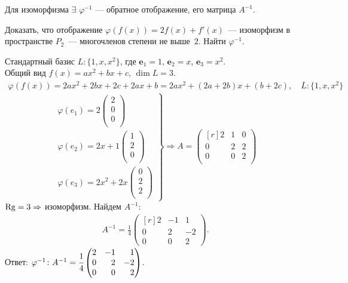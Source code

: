 Для изоморфизма $\exists$ $\varphi^{-1}$ --- \textsf{обратное отображение}, его матрица $A^{-1}$.

\begin{prim}
	Доказать, что отображение $\varphi(f(x)) = 2f(x) + f'(x)$~--- изоморфизм
	в пространстве $P_2$~---  многочленов степени не выше~$2$. Найти $\varphi^{-1}$.
\end{prim}
Стандартный базис $L\colon\{ 1, x, x^2 \}$, где $\textbf{e$_1$}=1$, $\textbf{e$_2$}=x$, $\textbf{e$_3$}=x^2$.\\
Общий вид $f(x) = ax^2 + bx + c$,
$\dim L = 3$.
\begin{gather*}
\varphi(f(x)) = 2ax^2 + 2bx + 2c + 2ax + b =
2ax^2 + (2a + 2b)x + (b + 2c),
\quad
\overline L\colon\{ 1, x, x^2 \}
\end{gather*}
$$
\left.
\begin{aligned}
\varphi (e_1)=2
\left(
\begin{smallmatrix}
2\\ 0\\ 0\\
\end{smallmatrix}
\right) \\
\varphi (e_2)=2x+1
\left(
\begin{smallmatrix}
1\\ 2\\ 0\\
\end{smallmatrix}
\right) \\
\varphi (e_3)=2x^2+2x
\left(
\begin{smallmatrix}
0\\ 2\\ 2\\
\end{smallmatrix}
\right) 
\end{aligned}
\right\}
\Rightarrow
A=
\begin{pmatrix*}[r]
2 & 1 & 0\\
0 & 2 & 2\\
0 & 0 & 2\\
\end{pmatrix*}
$$
$\operatorname{\mathop{Rg}}=3 \Rightarrow$ изоморфизм. Найдем $A^{-1}$:
\begin{gather*}
A^{-1} = \frac{1}{4} \begin{pmatrix*}[r] 2 & -1 & 1 \\ 0 & 2 & -2 \\
0 & 0 & 2 \end{pmatrix*}.
\end{gather*}
Ответ: $\varphi^{-1} \colon A^{-1} = \cfrac{1}{4} \begin{pmatrix*}[r] 2 & -1 & 1 \\ 0 & 2 & -2 \\
0 & 0 & 2 \end{pmatrix*}$.

